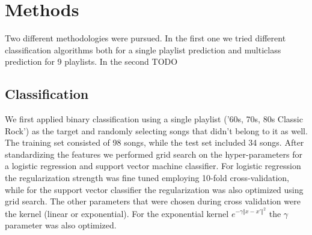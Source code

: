 \documentclass[acmtog]{acmart}
\begin{document}

\section{Methods}
\label{sec:sim}

Two different methodologies were pursued. In the first one we tried different classification algorithms both for a single playlist prediction and multiclass prediction for 9 playlists. In the second TODO

\subsection{Classification}

We first applied binary classification using a single playlist ('60s, 70s, 80s Classic Rock') as the target and randomly selecting songs that didn't belong to it as well. The training set consisted of 98 songs, while the test set included 34 songs. After standardizing the features we performed grid search on the hyper-parameters for a logistic regression and support vector machine classifier. For logistic regression the regularization strength was fine tuned employing 10-fold cross-validation, while for the support vector classifier the regularization was also optimized using grid search. The other parameters that were chosen during cross validation were the kernel (linear or exponential). For the exponential kernel $e^{-\gamma {\Vert x -x' \Vert}^{2}}$ the $\gamma$ parameter was also optimized.
\end{document}
